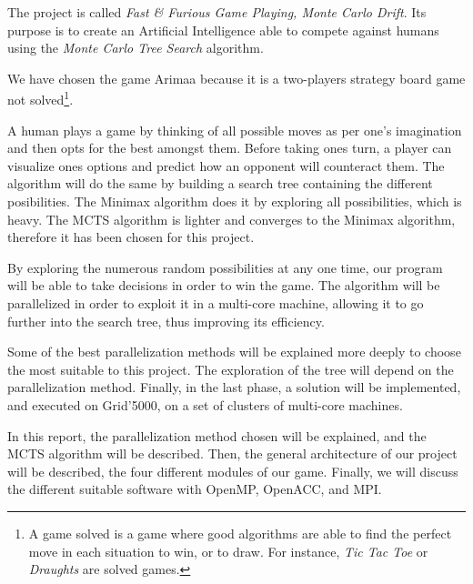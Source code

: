 The project is called \emph{Fast \& Furious Game Playing, Monte Carlo Drift}. Its purpose is to create an Artificial Intelligence able to compete against humans using the \emph{Monte Carlo Tree Search} algorithm.

We have chosen the game Arimaa because it is a two-players strategy board game not solved\footnote{A game solved is a game where good algorithms are able to find the perfect move in each situation to win, or to draw. For instance, \textit{Tic Tac Toe} or \textit{Draughts} are solved games.}.

A human plays a game by thinking of all possible moves as per one's imagination and then opts for the best amongst them. Before taking ones turn, a player can visualize ones options and predict how an opponent will counteract them. The algorithm will do the same by building a search tree containing the different posibilities. The Minimax algorithm does it by exploring all possibilities, which is heavy. The MCTS algorithm is lighter and converges to the Minimax algorithm, therefore it has been chosen for this project.

By exploring the numerous random possibilities at any one time, our program will be able to take decisions in order to win the game.
The algorithm will be parallelized in order to exploit it in a multi-core machine, allowing it to go further into the search tree, thus improving its efficiency.

Some of the best parallelization methods will be explained more deeply to choose the most suitable to this project.
The exploration of the tree will depend on the parallelization method.
Finally, in the last phase, a solution will be implemented, and executed on Grid'5000, on a set of clusters of multi-core machines.


In this report, the parallelization method chosen will be explained, and the MCTS algorithm will be described.
Then, the general architecture of our project will be described, the four different modules of our game.
Finally, we will discuss the different suitable software with OpenMP, OpenACC, and MPI.
